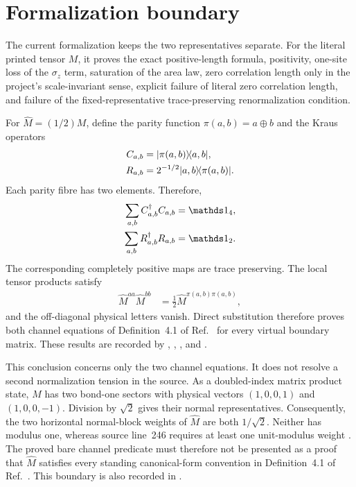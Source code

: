 \documentclass{article}
\begin{document}
\section{Formalization boundary}

The current formalization keeps the two representatives separate. For the
literal printed tensor $M$, it proves the exact positive-length formula,
positivity, one-site loss of the $\sigma_z$ term, saturation of the area law,
zero correlation length only in the project's scale-invariant sense, explicit
failure of literal zero correlation length, and failure of the
fixed-representative trace-preserving renormalization condition.

For $\widehat M=(1/2)M$, define the parity function
$\pi(a,b)=a\mathbin{\oplus}b$ and the Kraus operators
\begin{align}
    C_{a,b}
        &= |\pi(a,b)\rangle\!\langle a,b|,
    \label{eq:cpsv412_coarse_graining_kraus}\\
    R_{a,b}
        &= 2^{-1/2}|a,b\rangle\!\langle \pi(a,b)|.
    \label{eq:cpsv412_refinement_kraus}
\end{align}
Each parity fibre has two elements. Therefore,
\begin{align}
    \sum_{a,b} C_{a,b}^{\dagger}C_{a,b}
        &= \Id_4,
    \label{eq:cpsv412_coarse_graining_trace_preserving}\\
    \sum_{a,b} R_{a,b}^{\dagger}R_{a,b}
        &= \Id_2.
    \label{eq:cpsv412_refinement_trace_preserving}
\end{align}
The corresponding completely positive maps are trace preserving. The local
tensor products satisfy
\begin{align}
    \widehat M^{aa}\widehat M^{bb}
        &= \frac{1}{2}
           \widehat M^{\pi(a,b)\pi(a,b)},
    \label{eq:cpsv412_normalized_tensor_parity_product}
\end{align}
and the off-diagonal physical letters vanish. Direct substitution therefore
proves both channel equations of Definition~4.1 of
Ref.~\cite{Cirac2016MPDO_arXiv} for every virtual boundary matrix. These
results are recorded by
,
,
, and
.

This conclusion concerns only the two channel equations. It does not resolve a
second normalization tension in the source. As a doubled-index matrix product
state, $M$ has two bond-one sectors with physical vectors
$(1,0,0,1)$ and $(1,0,0,-1)$. Division by $\sqrt{2}$ gives their normal
representatives. Consequently, the two horizontal normal-block weights of
$\widehat M$ are both $1/\sqrt{2}$. Neither has modulus one, whereas source
line~246 requires at least one unit-modulus weight
\cite{Cirac2016MPDO_arXiv}. The proved bare channel predicate must therefore
not be presented as a proof that $\widehat M$ satisfies every standing
canonical-form convention in Definition~4.1 of
Ref.~\cite{Cirac2016MPDO_arXiv}. This boundary is also recorded in
.
\end{document}
